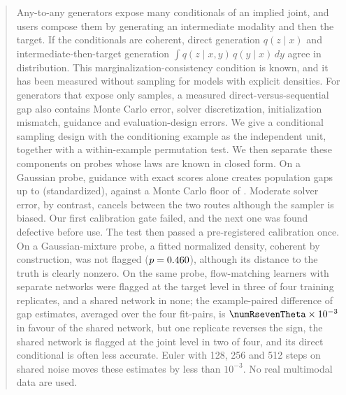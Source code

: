 \documentclass{article}
\theoremstyle{plain}
\theoremstyle{definition}
\theoremstyle{remark}
\begin{document}

\printAffiliationsAndNotice{}

\begin{abstract}
Any-to-any generators expose many conditionals of an implied joint, and users compose them by generating an intermediate modality and then the target.
If the conditionals are coherent, direct generation $q(z\mid x)$ and intermediate-then-target generation $\int q(z\mid x,y)\,q(y\mid x)\,dy$ agree in distribution. This marginalization-consistency condition is known, and it has been measured without sampling for models with explicit densities.
For generators that expose only samples, a measured direct-versus-sequential gap also contains Monte Carlo error, solver discretization, initialization mismatch, guidance and evaluation-design errors.
We give a conditional sampling design with the conditioning example as the independent unit, together with a within-example permutation test. We then separate these components on probes whose laws are known in closed form.
On a Gaussian probe, guidance with exact scores alone creates population gaps up to \numGapCFGFour{} (standardized), against a Monte Carlo floor of \numFloorM. Moderate solver error, by contrast, cancels between the two routes although the sampler is biased.
Our first calibration gate failed, and the next one was found defective before use. The test then passed a pre-registered calibration once.
On a Gaussian-mixture probe, a fitted normalized density, coherent by construction, was not flagged ($p=\numSynFitP$), although its distance to the truth is clearly nonzero.
On the same probe, flow-matching learners with separate networks were flagged at the target level in three of four training replicates, and a shared network in none; the example-paired difference of gap estimates, averaged over the four fit-pairs, is $\numRsevenTheta\times10^{-3}$ in favour of the shared network, but one replicate reverses the sign, the shared network is flagged at the joint level in two of four, and its direct conditional is often less accurate. Euler with 128, 256 and 512 steps on shared noise moves these estimates by less than $10^{-3}$. No real multimodal data are used.
\end{abstract}
\end{document}
